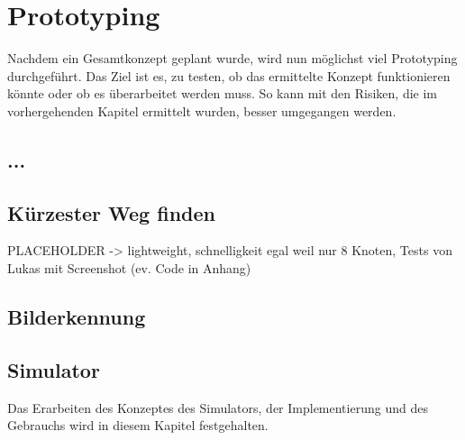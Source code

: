 \section{Prototyping}

Nachdem ein Gesamtkonzept geplant wurde, wird nun möglichst viel Prototyping durchgeführt. Das Ziel ist es, zu testen, ob das ermittelte Konzept funktionieren könnte oder ob es überarbeitet werden muss. So kann mit den Risiken, die im vorhergehenden Kapitel ermittelt wurden, besser umgegangen werden.

\subsection{...}

\subsection{Kürzester Weg finden}

PLACEHOLDER
-> lightweight, schnelligkeit egal weil nur 8 Knoten, Tests von Lukas mit Screenshot (ev. Code in Anhang)

\subsection{Bilderkennung}

\subsection{Simulator}

Das Erarbeiten des Konzeptes des Simulators, der Implementierung und des Gebrauchs wird in diesem Kapitel festgehalten.